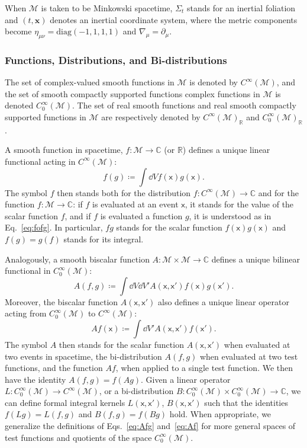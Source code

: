 \documentclass[letterpaper,12pt,titlepage,oneside,final]{book}
\newcommand{\M}{\mathcal{M}}
\newcommand{\mf}{\mathsf}%
\begin{document}
When $\M$ is taken to be Minkowski spacetime, $\Sigma_t$ stands for an inertial foliation and $(t,\bm x)$ denotes an inertial coordinate system, where the metric components become $\eta_{\mu\nu} = \text{diag}(-1,1,1,1)$ and $\nabla_\mu = \partial_\mu$.

\subsubsection*{Functions, Distributions, and Bi-distributions}

The set of complex-valued smooth functions in $\M$ is denoted by $C^\infty(\M)$, and the set of smooth compactly supported functions complex functions in $\M$ is denoted $C_0^\infty(\M)$. The set of real smooth functions and real smooth compactly supported functions in $\M$ are respectively denoted by  $C^\infty(\M)_\mathbb{R}$ and $C_0^\infty(\M)_\mathbb{R}$.

A smooth function in spacetime, $f:\M\to \mathbb{C}$ (or $\mathbb{R}$) defines a unique linear functional acting in $C^\infty(\M)$:
\begin{equation}\label{eq:fofg}
    f(g) \coloneqq \int \dd V f(\mf x) g(\mf x).
\end{equation}
The symbol $f$ then stands both for the distribution $f:C^\infty(\M)\to \mathbb{C}$ and for the function $f:\M\to \mathbb{C}$: if $f$ is evaluated at an event $\mf x$, it stands for the value of the scalar function $f$, and if $f$ is evaluated a function $g$, it is understood as in Eq.~\eqref{eq:fofg}. In particular, $fg$ stands for the scalar function $f(\mf x)g(\mf x)$ and $f(g) = g(f)$ stands for its integral.

Analogously, a smooth biscalar function $A:\M\times\M\to \mathbb{C}$ defines a unique bilinear functional in $C_0^\infty(\M)$:
\begin{equation}\label{eq:Afg}
    A(f,g) \coloneqq \int \dd V \dd V' A(\mf x, \mf x') f(\mf x) g(\mf x').
\end{equation}
Moreover, the biscalar function $A(\mf x, \mf x')$ also defines a unique linear operator acting from $C_0^\infty(\M)$ to $C^\infty(\M)$:
\begin{equation}\label{eq:Af}
    Af(\mf x) \coloneqq \int \dd V' A(\mf x, \mf x') f(\mf x').
\end{equation}
The symbol $A$ then stands for the scalar function $A(\mf x, \mf x')$ when evaluated at two events in spacetime, the bi-distribution $A(f,g)$ when evaluated at two test functions, and the function $Af$, when applied to a single test function. We then have the identity $A(f,g) = f(Ag)$. Given a linear operator $L:C_0^\infty(\M)\to C^\infty(\M)$, or a bi-distribution $B:C_0^\infty(\M)\times C_0^\infty(\M) \to \mathbb{C}$, we can define formal integral kernels $L(\mf x, \mf x')$, $B(\mf x, \mf x')$ such that the identities $f(Lg) = L(f,g)$ and $B(f,g) = f(Bg)$ hold. When appropriate, we generalize the definitions of Eqs.~\eqref{eq:Afg} and~\eqref{eq:Af} for more general spaces of test functions and quotients of the space $C_0^\infty(\M)$. 
\end{document}
